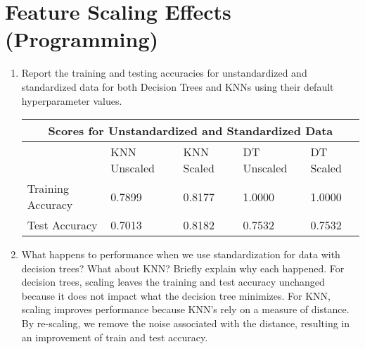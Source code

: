 \section{Feature Scaling Effects (Programming) }

\begin{enumerate}
    \item Report the training and testing accuracies for unstandardized and standardized data for both Decision Trees and KNNs using their default hyperparameter values. 
    \begin{center}
        \begin{tabular}{ |p{3cm}||p{2.5cm}|p{2.5cm}|p{2.5cm}|p{2.5cm}|  }
         \hline
         \multicolumn{5}{|c|}{Scores for Unstandardized and Standardized Data} \\
         \hline
         & KNN Unscaled & KNN Scaled & DT Unscaled & DT Scaled\\
         \hline
         Training Accuracy   &  0.7899  &  0.8177 &  1.0000  &  1.0000\\
         Test Accuracy   &  0.7013  &  0.8182 &  0.7532  &  0.7532\\
         \hline
        \end{tabular}
    \end{center}
    \item What happens to performance when we use standardization for data with decision trees? What about KNN? Briefly explain why each happened.
    \newline
    \newline
    For decision trees, scaling leaves the training and test accuracy unchanged because it does not impact what the decision tree minimizes.
   \newline
   \newline
   For KNN, scaling improves performance because KNN's rely on a measure of distance. By re-scaling, we remove the noise associated with the distance, resulting in an improvement of train and test accuracy. 
   
\end{enumerate}